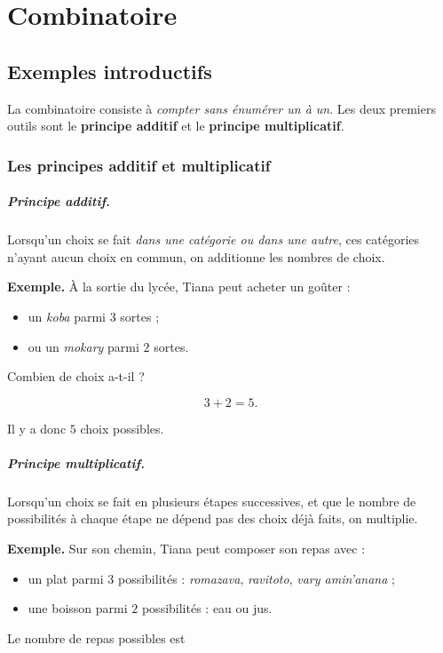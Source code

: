 \chapter{Combinatoire}

\section{Exemples introductifs}

La combinatoire consiste à \emph{compter sans énumérer un à un}. 
Les deux premiers outils sont le \textbf{principe additif} et le 
\textbf{principe multiplicatif}.

\subsection{Les principes additif et multiplicatif}

\paragraph{Principe additif.}
Lorsqu’un choix se fait \emph{dans une catégorie ou dans une autre}, ces catégories n’ayant
aucun choix en commun, on additionne les nombres de choix.

\medskip

\noindent\textbf{Exemple.} À la sortie du lycée, Tiana peut acheter un goûter :
\begin{itemize}
    \item un \emph{koba} parmi \(3\) sortes ;
    \item ou un \emph{mokary} parmi \(2\) sortes.
\end{itemize}
Combien de choix a-t-il ?

\[
3+2=5.
\]

Il y a donc \(\boxed{5}\) choix possibles.

\paragraph{Principe multiplicatif.}
Lorsqu’un choix se fait en plusieurs étapes successives, et que le nombre de possibilités
à chaque étape ne dépend pas des choix déjà faits, on multiplie.

\medskip

\noindent\textbf{Exemple.} Sur son chemin, Tiana peut composer son repas avec :
\begin{itemize}
    \item un plat parmi \(3\) possibilités : \emph{romazava}, \emph{ravitoto}, \emph{vary amin’anana} ;
    \item une boisson parmi \(2\) possibilités : eau ou jus.
\end{itemize}
Le nombre de repas possibles est

